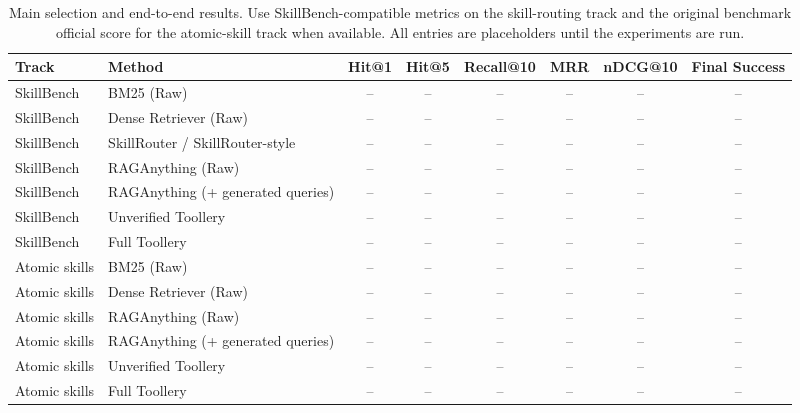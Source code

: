 \begin{table}[t]
\centering
\small
\begin{tabular}{llcccccc}
\hline
\textbf{Track} &
\textbf{Method} &
\textbf{Hit@1} &
\textbf{Hit@5} &
\textbf{Recall@10} &
\textbf{MRR} &
\textbf{nDCG@10} &
\textbf{Final Success} \\
\hline
SkillBench & BM25 (Raw) & -- & -- & -- & -- & -- & -- \\
SkillBench & Dense Retriever (Raw) & -- & -- & -- & -- & -- & -- \\
SkillBench & SkillRouter / SkillRouter-style & -- & -- & -- & -- & -- & -- \\
SkillBench & RAGAnything (Raw) & -- & -- & -- & -- & -- & -- \\
SkillBench & RAGAnything (+ generated queries) & -- & -- & -- & -- & -- & -- \\
SkillBench & Unverified Toollery & -- & -- & -- & -- & -- & -- \\
SkillBench & Full Toollery & -- & -- & -- & -- & -- & -- \\
\hline
Atomic skills & BM25 (Raw) & -- & -- & -- & -- & -- & -- \\
Atomic skills & Dense Retriever (Raw) & -- & -- & -- & -- & -- & -- \\
Atomic skills & RAGAnything (Raw) & -- & -- & -- & -- & -- & -- \\
Atomic skills & RAGAnything (+ generated queries) & -- & -- & -- & -- & -- & -- \\
Atomic skills & Unverified Toollery & -- & -- & -- & -- & -- & -- \\
Atomic skills & Full Toollery & -- & -- & -- & -- & -- & -- \\
\hline
\end{tabular}
\caption{Main selection and end-to-end results. Use SkillBench-compatible
metrics on the skill-routing track and the original benchmark official score for
the atomic-skill track when available. All entries are placeholders until the
experiments are run.}
\label{tab:main-selection-results}
\end{table}

